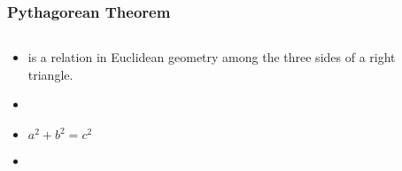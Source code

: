 \begin{module}[id=pythagoreantheorem]
\begin{frame}
  \frametitle{Pythagorean Theorem}
  \begin{columns}
    \begin{column}{5.8cm}
      \begin{itemize}
      \item
      \begin{definition}
         is a relation in Euclidean geometry among the three sides of a right triangle.
      \end{definition}
      \item {}
      \item $a^2+b^2 = c^2$
      \item {}
    \end{itemize}
    \end{column}
    \begin{column}{5.5cm}
    \end{column}
  \end{columns}
\end{frame}
\end{module}

